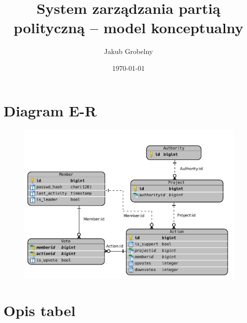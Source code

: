 \documentclass[12pt]{article}
\title{\huge\textbf{System zarządzania partią polityczną -- model konceptualny}}
\author{\Large Jakub Grobelny}
\date{\today}
\begin{document}
\maketitle

\section{Diagram E-R}

\begin{figure}[H]
    \includegraphics[scale=0.42]{schema.png}
\label{figure:er}
\end{figure}

\section{Opis tabel}
\end{document}
